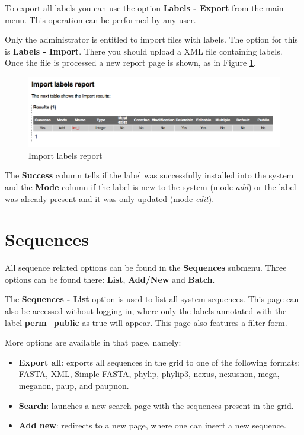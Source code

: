To export all labels you can use the option \textbf{Labels - Export} from the main menu. This
operation can be performed by any user.

Only the administrator is entitled to import files with labels. The option for this is
\textbf{Labels - Import}. There you should upload a XML file containing labels.
Once the file is processed a new report page is shown, as in Figure \ref{fig:import_labels}.

\begin{figure}[H]
  \centering
    \includegraphics[scale=0.4]{import_labels.png}
  \caption{Import labels report}
  \label{fig:import_labels}
\end{figure}

The \textbf{Success} column tells if the label was successfully installed into the system
and the \textbf{Mode} column if the label is new to the system (mode \textit{add}) or the label
was already present and it was only updated (mode \textit{edit}).

\section{Sequences}

All sequence related options can be found in the \textbf{Sequences} submenu.
Three options can be found there: \textbf{List}, \textbf{Add/New} and \textbf{Batch}.

The \textbf{Sequences - List} option is used to list all system sequences. This page can also
be accessed without logging in, where only the labels annotated with the label \textbf{perm\_public}
as true will appear. This page also features a filter form.

More options are available in that page, namely:

\begin{itemize}
  \item \textbf{Export all}: exports all sequences in the grid to one of the following formats:
  FASTA, XML, Simple FASTA, phylip, phylip3, nexus, nexusnon, mega, meganon, paup, and paupnon.
  
  \item \textbf{Search}: launches a new search page with the sequences present in the grid.
  
  \item \textbf{Add new}: redirects to a new page, where one can insert a new sequence.
\end{itemize}

